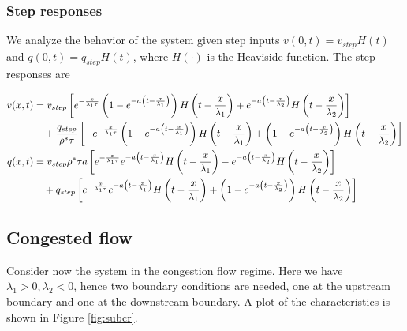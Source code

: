 \documentclass[preprint]{elsarticle}
\begin{document}
\subsubsection{Step responses}
We analyze the behavior of the system given step inputs $v(0,t)=v_{step}H(t)$ and $q(0,t)=q_{step}H(t)$, where $H(\cdot)$ is the Heaviside function. The step responses are

\begin{align} 
v(x,t) &= v_{step}\left[e^{-\frac{x}{\lambda_1\tau}}\left(1 - e^{-a\left(t-\frac{x}{\lambda_1}\right)}\right)H\left(t-\frac{x}{\lambda_1}\right) + e^{-a\left(t-\frac{x}{\lambda_2}\right)}H\left(t-\frac{x}{\lambda_2}\right)\right] \notag \\
&\quad+ \dfrac{q_{step}}{\rho^* \tau}\left[- e^{-\frac{x}{\lambda_1\tau}}\left(1 - e^{-a\left(t-\frac{x}{\lambda_1}\right)}\right)H\left(t-\frac{x}{\lambda_1}\right) + \left(1 - e^{-a\left(t-\frac{x}{\lambda_2}\right)}\right)H\left(t-\frac{x}{\lambda_2}\right) \right] \\
q(x,t) &= v_{step}\rho^*\tau a\left[e^{-\frac{x}{\lambda_1\tau}}e^{-a\left(t-\frac{x}{\lambda_1}\right)}H\left(t-\frac{x}{\lambda_1}\right) - e^{-a\left(t-\frac{x}{\lambda_2}\right)}H\left(t-\frac{x}{\lambda_2}\right) \right] \notag \\
&\quad+ q_{step}\left[ e^{-\frac{x}{\lambda_1\tau}}e^{-a\left(t-\frac{x}{\lambda_1}\right)}H\left(t-\frac{x}{\lambda_1}\right) + \left(1 - e^{-a\left(t-\frac{x}{\lambda_2}\right)}\right)H\left(t-\frac{x}{\lambda_2}\right)\right]
\end{align}


\subsection{Congested flow}
Consider now the system in the congestion flow regime. Here we have $\lambda_1 > 0, \lambda_2 < 0$, hence two boundary conditions are needed, one at the upstream boundary and one at the downstream boundary. A plot of the characteristics is shown in Figure \ref{fig:subcr}. \\
\end{document}
